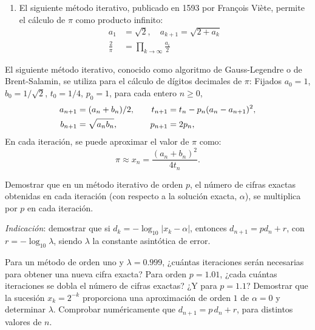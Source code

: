 \documentclass[11pt]{article}
\begin{document}

\begin{problemas}
  \begin{problema}
    \begin{enumerate}
    \item El siguiente método iterativo, publicado en 1593 por
      François Viète, permite el cálculo de $\pi$ como producto
      infinito:
      \begin{align*}
        a_1 &= \sqrt{2}, \quad a_{k+1} = \sqrt{2+a_k}\\
        \frac{2}{\pi} & = \prod_{k\to\infty} \frac{a_i}2
      \end{align*}
    \end{enumerate}
  \end{problema}
  \begin{problema}
    El siguiente método iterativo, conocido como algoritmo de
    Gauss-Legendre o de Brent-Salamin, se utiliza para el cálculo de
    dígitos decimales de $\pi$:
    Fijados $a_0=1$, $b_0=1/\sqrt 2$, $t_0=1/4$, $p_0=1$, para cada entero
    $n\ge 0$,
    \begin{align*}
      a_{n+1}&=(a_{n}+b_{n})/2 , &\quad
      t_{n+1}&=t_n - p_n(a_n -a_{n+1})^2, \\
      b_{n+1} &=\sqrt{a_{n}\*b_{n}}, &\quad p_{n+1}&=2p_n,
    \end{align*}
    En cada iteración, se puede aproximar el valor de $\pi$ como: 
    $$
    \pi \approx x_n= \frac{(a_n+b_n)^2}{4t_n}.
    $$
  \end{problema}

  \begin{problema}
    Demostrar que en un método iterativo de orden $p$, el número de
    cifras exactas obtenidas en cada iteración (con respecto a la
    solución exacta, $\alpha$), se multiplica por $p$ en cada
    iteración.
    \begin{flushright}
      \scriptsize \textit{Indicación}: demostrar que si
      $d_k=-\log_{10}|x_k-\alpha|$, entonces $d_{n+1}=p d_n + r$, con
      $r=-\log_{10}\lambda$, siendo $\lambda$ la constante asintótica
      de error.
    \end{flushright}
    Para un método de orden uno y $\lambda=0.999$, ¿cuántas
    iteraciones serán necesarias para obtener una nueva cifra exacta?
    Para orden $p=1.01$, ¿cada cuántas iteraciones se dobla el número
    de cifras exactas? ¿Y para $p=1.1$? Demostrar que la sucesión
    $x_k=2^{-k}$ proporciona una aproximación de orden $1$ de
    $\alpha=0$ y determinar $\lambda$. Comprobar numéricamente que
    $d_{n+1}=p\, d_n + r$, para distintos valores de $n$.
  \end{problema}
\end{problemas}
\end{document}
